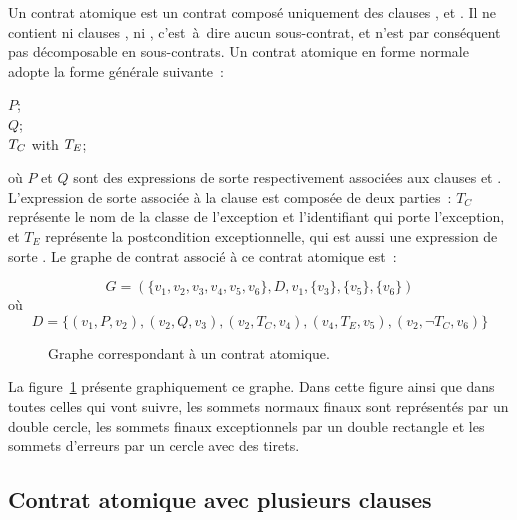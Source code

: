 Un {\strong contrat atomique} est un contrat composé uniquement des clauses
\arequires, \aensures et \athrowable. Il ne contient ni clauses \abehavior, ni
\adefault, c'est~à~dire aucun sous-contrat, et n'est par conséquent pas
décomposable en sous-contrats. Un contrat atomique en forme normale adopte
la forme générale suivante~:
%
\begin{pre}
\arequires  \(P\); \\
\aensures   \(Q\); \\
\athrowable \(T\sb{C}\) with \(T\sb{E}\);
\end{pre}
%
où $P$ et $Q$ sont des expressions de sorte  respectivement
associées aux clauses \arequires et \aensures. L'expression de sorte
 associée à la clause \athrowable est composée de
deux parties~: $T_C$ représente le nom de la classe de l'exception et
l'identifiant qui porte l'exception, et $T_E$ représente la postcondition
exceptionnelle, qui est aussi une expression de sorte . Le
graphe de contrat associé à ce contrat atomique est~:

$$G = (
  \{v_1, v_2, v_3, v_4, v_5, v_6\},
  D,
  v_1,
  \{v_3\},
  \{v_5\},
  \{v_6\}
)$$
%
où
%
$$D = \{
  (v_1, P, v_2),
  (v_2, Q, v_3),
  (v_2, T_C, v_4),
  (v_4, T_E, v_5),
  (v_2, \neg T_C, v_6)
\}$$

\begin{figure}


\caption{\label{figure:test:atomic_graph} Graphe correspondant à un contrat
atomique.}

\end{figure}

\begin{example}

La figure~\ref{figure:test:atomic_graph} présente graphiquement ce graphe. Dans
cette figure ainsi que dans toutes celles qui vont suivre, les sommets normaux
finaux sont représentés par un double cercle, les sommets finaux
exceptionnels par un double rectangle et les sommets d'erreurs par un cercle
avec des tirets.

\end{example}

\subsection{Contrat atomique avec plusieurs clauses \athrowable}
\label{subsection:test:throwable_graph}


